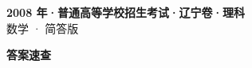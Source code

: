 \documentclass[zihao=-4, a4paper]{ctexart}
\begin{document}
\begin{center}
  {\Large\bfseries 2008 年·普通高等学校招生考试·辽宁卷·理科}\\[4pt]
  {\large 数学 · 简答版}
\end{center}
\medskip
{}

\clearpage
{}
\begin{center}{\Large\bfseries 答案速查}\end{center}
\medskip

\end{document}
